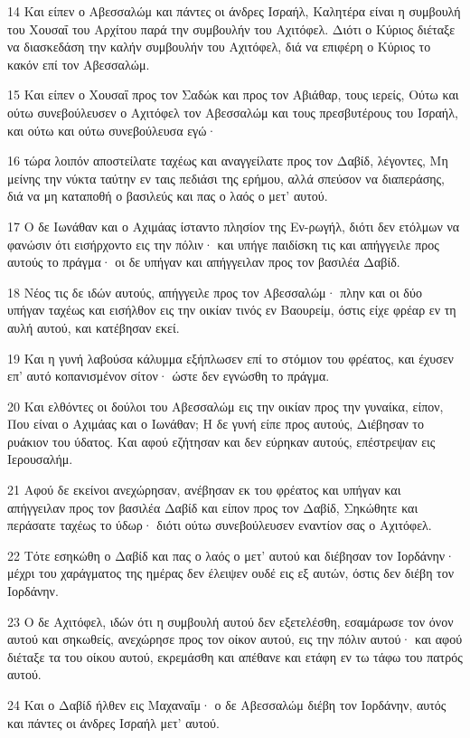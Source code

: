 \par 14 Και είπεν ο Αβεσσαλώμ και πάντες οι άνδρες Ισραήλ, Καλητέρα είναι η συμβουλή του Χουσαΐ του Αρχίτου παρά την συμβουλήν του Αχιτόφελ. Διότι ο Κύριος διέταξε να διασκεδάση την καλήν συμβουλήν του Αχιτόφελ, διά να επιφέρη ο Κύριος το κακόν επί τον Αβεσσαλώμ.
\par 15 Και είπεν ο Χουσαΐ προς τον Σαδώκ και προς τον Αβιάθαρ, τους ιερείς, Ούτω και ούτω συνεβούλευσεν ο Αχιτόφελ τον Αβεσσαλώμ και τους πρεσβυτέρους του Ισραήλ, και ούτω και ούτω συνεβούλευσα εγώ·
\par 16 τώρα λοιπόν αποστείλατε ταχέως και αναγγείλατε προς τον Δαβίδ, λέγοντες, Μη μείνης την νύκτα ταύτην εν ταις πεδιάσι της ερήμου, αλλά σπεύσον να διαπεράσης, διά να μη καταποθή ο βασιλεύς και πας ο λαός ο μετ' αυτού.
\par 17 Ο δε Ιωνάθαν και ο Αχιμάας ίσταντο πλησίον της Εν-ρωγήλ, διότι δεν ετόλμων να φανώσιν ότι εισήρχοντο εις την πόλιν· και υπήγε παιδίσκη τις και απήγγειλε προς αυτούς το πράγμα· οι δε υπήγαν και απήγγειλαν προς τον βασιλέα Δαβίδ.
\par 18 Νέος τις δε ιδών αυτούς, απήγγειλε προς τον Αβεσσαλώμ· πλην και οι δύο υπήγαν ταχέως και εισήλθον εις την οικίαν τινός εν Βαουρείμ, όστις είχε φρέαρ εν τη αυλή αυτού, και κατέβησαν εκεί.
\par 19 Και η γυνή λαβούσα κάλυμμα εξήπλωσεν επί το στόμιον του φρέατος, και έχυσεν επ' αυτό κοπανισμένον σίτον· ώστε δεν εγνώσθη το πράγμα.
\par 20 Και ελθόντες οι δούλοι του Αβεσσαλώμ εις την οικίαν προς την γυναίκα, είπον, Που είναι ο Αχιμάας και ο Ιωνάθαν; Η δε γυνή είπε προς αυτούς, Διέβησαν το ρυάκιον του ύδατος. Και αφού εζήτησαν και δεν εύρηκαν αυτούς, επέστρεψαν εις Ιερουσαλήμ.
\par 21 Αφού δε εκείνοι ανεχώρησαν, ανέβησαν εκ του φρέατος και υπήγαν και απήγγειλαν προς τον βασιλέα Δαβίδ και είπον προς τον Δαβίδ, Σηκώθητε και περάσατε ταχέως το ύδωρ· διότι ούτω συνεβούλευσεν εναντίον σας ο Αχιτόφελ.
\par 22 Τότε εσηκώθη ο Δαβίδ και πας ο λαός ο μετ' αυτού και διέβησαν τον Ιορδάνην· μέχρι του χαράγματος της ημέρας δεν έλειψεν ουδέ εις εξ αυτών, όστις δεν διέβη τον Ιορδάνην.
\par 23 Ο δε Αχιτόφελ, ιδών ότι η συμβουλή αυτού δεν εξετελέσθη, εσαμάρωσε τον όνον αυτού και σηκωθείς, ανεχώρησε προς τον οίκον αυτού, εις την πόλιν αυτού· και αφού διέταξε τα του οίκου αυτού, εκρεμάσθη και απέθανε και ετάφη εν τω τάφω του πατρός αυτού.
\par 24 Και ο Δαβίδ ήλθεν εις Μαχαναΐμ· ο δε Αβεσσαλώμ διέβη τον Ιορδάνην, αυτός και πάντες οι άνδρες Ισραήλ μετ' αυτού.

